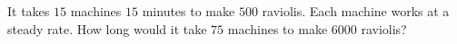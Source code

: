 It takes $15$ machines $15$ minutes to make $500$ raviolis. Each machine works at a steady rate. How long would it take $75$ machines to make $6000$ raviolis?
